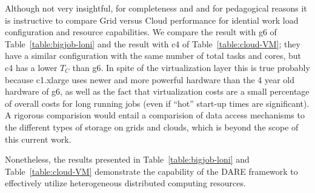 \documentclass{acm_proc_article-sp}
\begin{document}
Although not very insightful, for completeness and and for pedagogical
reasons it is instructive to compare Grid versus Cloud performance for
idential work load configuration and resource capabilities.  We
compare the result with g6 of Table~\ref{table:bigjob-loni} and the
result with c4 of Table~\ref{table:cloud-VM}; they have a similar
configuration with the same number of total tasks and cores, but c4
has a lower $T_C$ than g6. In spite of the virtualization layer this
is true probably because c1.xlarge uses newer and more powerful
hardware than the 4 year old hardware of g6, as well as the fact that
virtualization costs are a small percentage of overall costs for long
running jobs (even if ``hot'' start-up times are significant).  A
rigorous comparision would entail a comparision of data access
mechanisms to the different types of storage on grids and clouds,
which is beyond the scope of this current work.

Nonetheless, the results presented in Table~\ref{table:bigjob-loni}
and Table~\ref{table:cloud-VM} demonstrate the capability of the DARE
framework to effectively utilize heterogeneous distributed computing
resources.





\end{document}
